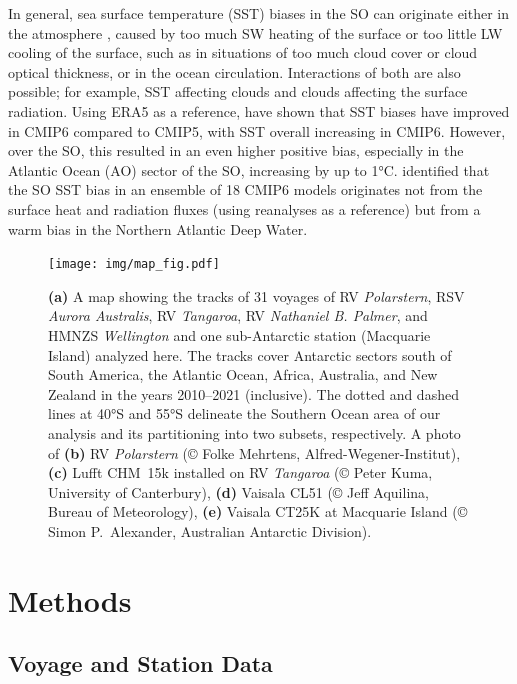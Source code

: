 \documentclass[draft]{agujournal2019}
\begin{document}
In general, sea surface temperature (SST) biases in the SO can originate either in the atmosphere \cite{hyder2018}, caused by too much SW heating of the surface or too little LW cooling of the surface, such as in situations of too much cloud cover or cloud optical thickness, or in the ocean circulation. Interactions of both are also possible; for example, SST affecting clouds and clouds affecting the surface radiation. Using ERA5 as a reference,  have shown that SST biases have improved in CMIP6 compared to CMIP5, with SST overall increasing in CMIP6. However, over the SO, this resulted in an even higher positive bias, especially in the Atlantic Ocean (AO) sector of the SO, increasing by up to 1°C.  identified that the SO SST bias in an ensemble of 18 CMIP6 models originates not from the surface heat and radiation fluxes (using reanalyses as a reference) but from a warm bias in the Northern Atlantic Deep Water.

\begin{figure}[b!]
\centering
\texttt{[image: img/map\_fig.pdf]}
\caption{
\textbf{(a)} A map showing the tracks of 31 voyages of RV \emph{Polarstern}, RSV \emph{Aurora Australis}, RV \emph{Tangaroa}, RV \emph{Nathaniel B. Palmer}, and HMNZS \emph{Wellington} and one sub-Antarctic station (Macquarie Island) analyzed here. The tracks cover Antarctic sectors south of South America, the Atlantic Ocean, Africa, Australia, and New Zealand in the years 2010–2021 (inclusive). The dotted and dashed lines at 40°S and 55°S delineate the Southern Ocean area of our analysis and its partitioning into two subsets, respectively. A photo of \textbf{(b)} RV \emph{Polarstern} (© Folke Mehrtens, Alfred-Wegener-Institut), \textbf{(c)} Lufft CHM~15k installed on RV \emph{Tangaroa} (© Peter Kuma, University of Canterbury), \textbf{(d)} Vaisala CL51 (© Jeff Aquilina, Bureau of Meteorology), \textbf{(e)} Vaisala CT25K at Macquarie Island (© Simon P.\ Alexander, Australian Antarctic Division).
}
\label{fig:map}
\end{figure}

\section{Methods}
\label{sec:methods}

\subsection{Voyage and Station Data}
\label{sec:voyage-and-station-data}
\end{document}
